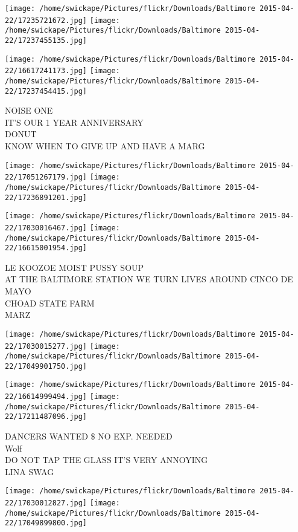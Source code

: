 \documentclass[10pt,letterpaper]{article}
\begin{document}
\texttt{[image: /home/swickape/Pictures/flickr/Downloads/Baltimore 2015-04-22/17235721672.jpg]}
\texttt{[image: /home/swickape/Pictures/flickr/Downloads/Baltimore 2015-04-22/17237455135.jpg]}

\texttt{[image: /home/swickape/Pictures/flickr/Downloads/Baltimore 2015-04-22/16617241173.jpg]}
\texttt{[image: /home/swickape/Pictures/flickr/Downloads/Baltimore 2015-04-22/17237454415.jpg]}

NOISE ONE\\
IT'S OUR 1 YEAR ANNIVERSARY\\
DONUT\\
KNOW WHEN TO GIVE UP AND HAVE A MARG\\
\pagebreak

\texttt{[image: /home/swickape/Pictures/flickr/Downloads/Baltimore 2015-04-22/17051267179.jpg]}
\texttt{[image: /home/swickape/Pictures/flickr/Downloads/Baltimore 2015-04-22/17236891201.jpg]}

\texttt{[image: /home/swickape/Pictures/flickr/Downloads/Baltimore 2015-04-22/17030016467.jpg]}
\texttt{[image: /home/swickape/Pictures/flickr/Downloads/Baltimore 2015-04-22/16615001954.jpg]}

LE KOOZOE MOIST PUSSY SOUP\\
AT THE BALTIMORE STATION WE TURN LIVES AROUND CINCO DE MAYO\\
CHOAD STATE FARM\\
MARZ\\
\pagebreak

\texttt{[image: /home/swickape/Pictures/flickr/Downloads/Baltimore 2015-04-22/17030015277.jpg]}
\texttt{[image: /home/swickape/Pictures/flickr/Downloads/Baltimore 2015-04-22/17049901750.jpg]}

\texttt{[image: /home/swickape/Pictures/flickr/Downloads/Baltimore 2015-04-22/16614999494.jpg]}
\texttt{[image: /home/swickape/Pictures/flickr/Downloads/Baltimore 2015-04-22/17211487096.jpg]}

DANCERS WANTED \$ NO EXP. NEEDED\\
Wolf\\
DO NOT TAP THE GLASS IT'S VERY ANNOYING\\
LINA SWAG\\
\pagebreak

\texttt{[image: /home/swickape/Pictures/flickr/Downloads/Baltimore 2015-04-22/17030012827.jpg]}
\texttt{[image: /home/swickape/Pictures/flickr/Downloads/Baltimore 2015-04-22/17049899800.jpg]}
\end{document}
